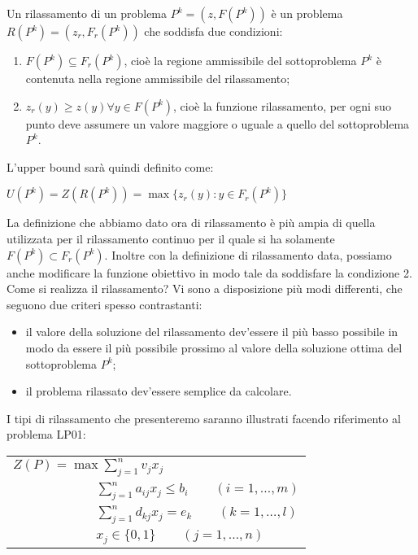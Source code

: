 \documentclass[11pt]{book}
\begin{document}
Un rilassamento di un problema $P^k = (z, F(P^k))$ \`e un problema
$R(P^k) = (z_r, F_r(P^k))$ che soddisfa due condizioni:

\begin{enumerate}
\item $F(P^k) \subseteq F_r(P^k)$, cio\`e la regione ammissibile del
  sottoproblema $P^k$ \`e contenuta nella regione ammissibile del
  rilassamento;
\item $z_r(y) \geq z(y) \forall y \in F(P^k)$, cio\`e la funzione
  rilassamento, per ogni suo punto deve assumere un valore maggiore o
  uguale a quello del sottoproblema $P^k$.
\end{enumerate}

L'upper bound sar\`a quindi definito come:
\begin{center}
$U(P^k) = Z(R(P^k)) = \max \{ z_r(y) : y \in F_r (P^k) \}$
\end{center}

La definizione che abbiamo dato ora di rilassamento \`e pi\`u ampia di
quella utilizzata per il rilassamento continuo per il quale si ha
solamente $F(P^k) \subset F_r(P^k)$. Inoltre con la definizione di
rilassamento data, possiamo anche modificare la funzione obiettivo in
modo tale da soddisfare la condizione 2. Come si realizza il
rilassamento? Vi sono a disposizione pi\`u modi differenti, che seguono
due criteri spesso contrastanti:

\begin{itemize}
\item il valore della soluzione del rilassamento dev'essere il pi\`u
  basso possibile in modo da essere il pi\`u possibile prossimo al
  valore della soluzione ottima del sottoproblema $P^k$;
\item il problema rilassato dev'essere semplice da calcolare.
\end{itemize}

I tipi di rilassamento che presenteremo saranno illustrati facendo
riferimento al problema LP01:

\vspace{11pt}
\begin{center}
\begin{tabular}{l}
$Z(P) = \max \sum \limits_{j=1}^n v_j x_j$\\
$\phantom{Z(P) = max} \sum \limits_{j=1}^n a_{ij}x_j \leq b_i \qquad (i=1,\dots,m)$\\
$\phantom{Z(P) = max} \sum \limits_{j=1}^n d_{kj}x_j = e_k \qquad (k=1,\dots,l)$\\
$\phantom{Z(P) = max} x_j \in \{0,1\} \qquad (j=1,\dots,n)$
\end{tabular}
\end{center}
\vspace{11pt}
\end{document}
